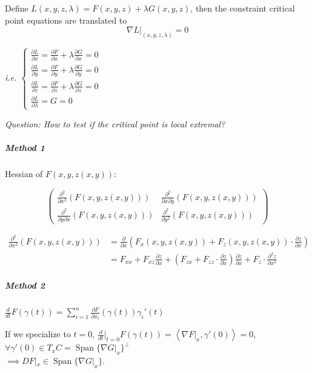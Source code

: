 Define $L(x,y,z,\lambda)=F(x,y,z)+\lambda G(x,y,z)$, then the constraint critical point equations are translated to
$$\nabla L|_{(x,y,z,\lambda)}=0$$

\emph{i.e. $\begin{cases}
            \frac{\partial L}{\partial x}=\frac{\partial F}{\partial x}+\lambda\frac{\partial G}{\partial x}=0 \\
            \frac{\partial L}{\partial y}=\frac{\partial F}{\partial y}+\lambda\frac{\partial G}{\partial y}=0 \\
            \frac{\partial L}{\partial z}=\frac{\partial F}{\partial z}+\lambda\frac{\partial G}{\partial z}=0 \\
            \frac{\partial L}{\partial\lambda}=G=0
        \end{cases}$}

\emph{}

\emph{Question: How to test if the critical point is local extremal?}

\subparagraph*{Method 1}

Hessian of $F(x,y,z(x,y))$:

$$\begin{pmatrix}
        \frac{\partial^2}{\partial x^2}(F(x,y,z(x,y)))         & \frac{\partial^2}{\partial x\partial y}(F(x,y,z(x,y))) \\
        \frac{\partial^2}{\partial y\partial x}(F(x,y,z(x,y))) & \frac{\partial^2}{\partial y^2}(F(x,y,z(x,y)))
    \end{pmatrix}$$

\begin{align*}
    \frac{\partial^2}{\partial x^2}(F(x,y,z(x,y))) & =\frac{\partial}{\partial x}(F_x(x,y,z(x,y))+F_z(x,y,z(x,y))\cdot\frac{\partial z}{\partial x})                                                                      \\
                                                   & =F_{xx}+F_{xz}\frac{\partial z}{\partial x}+(F_{zx}+F_{zz}\cdot\frac{\partial z}{\partial x})\frac{\partial z}{\partial x}+F_z\cdot\frac{\partial^2 z}{\partial x^2}
\end{align*}

\subparagraph*{Method 2}

$\frac{d}{dt}F(\gamma(t))=\sum_{i=1}^n\frac{\partial F}{\partial x_i}(\gamma(t))\gamma_i'(t)$

If we specialize to $t=0$, $\frac{d}{dt}|_{t=0}F(\gamma(t))=\left\langle\nabla F|_x,\gamma'(0)\right\rangle=0$, $\forall \gamma'(0)\in T_xC=\operatorname{Span}\{\nabla G|_x\}^\perp$\\
$\implies DF|_x\in\operatorname{Span}\{\nabla G|_x\}$.

